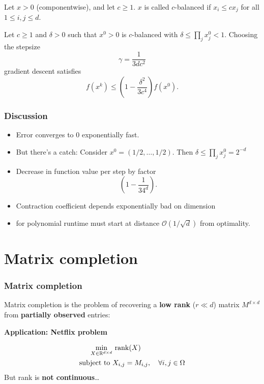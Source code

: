 \documentclass[aspectratio=149]{beamer}
\DeclareMathOperator*{\rank}{rank}
\begin{document}
\begin{frame}
  \frametitle{}
  \begin{definition}
    Let $x > 0$ (componentwise), and let $c \ge 1$. $x$ is called $c$-balanced if $x_i \le cx_j$ for all $1 \le i, j \le d$.
  \end{definition}

  \begin{theorem}
    Let $c\ge 1$ and $\delta> 0$ such that $x^0 > 0$ is $c$-balanced with $\delta \le \prod_j x^0_j < 1$. Choosing the stepsize
    \begin{equation}
      \gamma = \frac{1}{3d c^2}
    \end{equation}
    gradient descent satisfies
    \begin{equation}
      f(x^k) \le {\left( 1- \frac{\delta^2}{3 c^4} \right)} f(x^0).
    \end{equation}
  \end{theorem}


\end{frame}


\begin{frame}
  \frametitle{Discussion}

  \begin{itemize}
    \item Error converges to 0 exponentially fast.
    \item But there's a catch: Consider $x^0 = (1/2, \dots, 1/2)$. Then $\delta \le \prod_j x^0_j = 2^{-d}$
    \item Decrease in function value per step by factor
          \begin{equation}
            \left( 1- \frac{1}{3 4^d} \right).
          \end{equation}
    \item Contraction coefficient depends exponentially bad on dimension
    \item for polynomial runtime must start at distance $\mathcal{O}(1/\sqrt{d})$ from optimality.
  \end{itemize}
\end{frame}


\section{Matrix completion}%
\label{sec:}

\begin{frame}
  \frametitle{Matrix completion}

  Matrix completion is the problem of recovering a \textbf{low rank} ($r \ll d$) matrix $M^{d\times d}$ from \textbf{partially observed} entries:
  \begin{block}{}
    \textbf{Application: Netflix problem}
  \end{block}
  \begin{align}
    \min_{X\in \R^{d\times d}} &\, \rank(X) \\
    \text{subject to } & X_{i,j} = M_{i,j}, \quad \forall i,j \in \Omega
  \end{align}
  But rank is \textbf{not continuous}\ldots
\end{frame}
\end{document}
